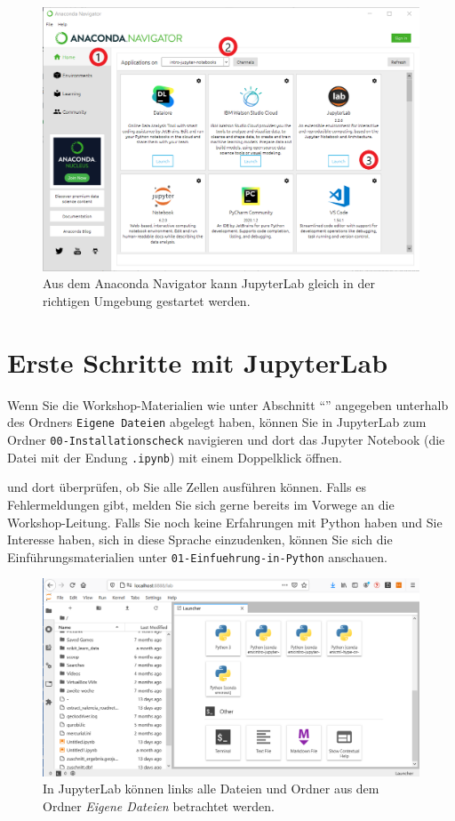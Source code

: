 \documentclass{tufte-handout}
\begin{document}
\begin{figure}[h]
  \includegraphics{anaconda-navigator-jupyterlab--mit-reihenfolge}
  \caption{Aus dem Anaconda Navigator kann JupyterLab gleich in der richtigen Umgebung gestartet werden.}%
\label{fig:start-jupyterlab}
\end{figure}

\section{Erste Schritte mit JupyterLab}

Wenn Sie die Workshop-Materialien wie unter Abschnitt \enquote{} angegeben unterhalb des Ordners \texttt{Eigene Dateien} abgelegt haben, 
können Sie in JupyterLab zum Ordner 
\texttt{00-Installationscheck}
navigieren und dort das Jupyter Notebook (die Datei mit der Endung \texttt{.ipynb}) mit einem Doppelklick öffnen.

 und dort überprüfen, ob Sie alle Zellen ausführen können.
Falls es Fehlermeldungen gibt, melden Sie sich gerne bereits im Vorwege an die Workshop-Leitung.
Falls Sie noch keine Erfahrungen mit Python haben und Sie Interesse haben, sich in diese Sprache einzudenken,
können Sie sich die Einführungsmaterialien unter
\texttt{01-Einfuehrung-in-Python}
anschauen.

\begin{figure}[h]
  \includegraphics{jupyterlab-running}
  \caption{In JupyterLab können links alle Dateien und Ordner aus dem Ordner \emph{Eigene Dateien} betrachtet werden.}%
\label{fig:start-jupyterlab}
\end{figure}



\end{document}
